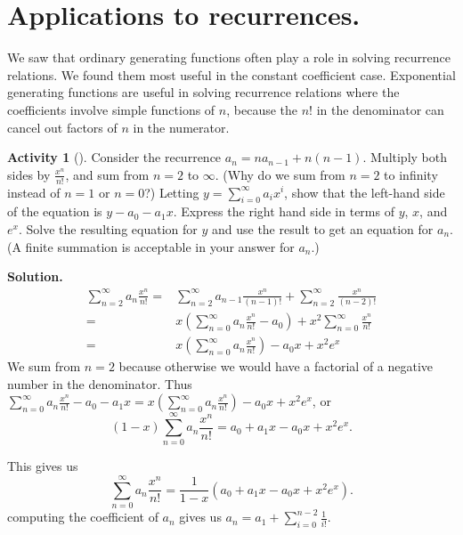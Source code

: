 \documentclass[10pt,]{book}
\theoremstyle{plain}
\theoremstyle{definition}
\newtheorem{activity}[project]{Activity}
\numberwithin{equation}{chapter}
\newcommand{\amp}{&}
\begin{document}
\section[{Applications to recurrences.}]{Applications to recurrences.}\label{section-28}
We saw that ordinary generating functions often play a role in solving recurrence relations. We found them most useful in the constant coefficient case. Exponential generating functions are useful in solving recurrence relations where the coefficients involve simple functions of \(n\), because the \(n!\) in the denominator can cancel out factors of \(n\) in the numerator.%
\begin{activity}[]\label{activity-362}
Consider the recurrence \(a_n=na_{n-1} +n(n-1)\). Multiply both sides by \(\frac{x^n}{n!}\), and sum from \(n=2\) to \(\infty\). (Why do we sum from \(n=2\) to infinity instead of \(n=1\) or \(n=0\)?) Letting \(y =
\sum_{i=0}^\infty a_ix^i\), show that the left-hand side of the equation is \(y-a_0 -a_1x\). Express the right hand side in terms of \(y\), \(x\), and \(e^x\). Solve the resulting equation for \(y\) and use the result to get an equation for \(a_n\). (A finite summation is acceptable in your answer for \(a_n\).)%
\par\medskip\noindent%
\textbf{Solution.}\quad %
\begin{align*}
\sum_{n=2}^\infty a_n\frac{x^n}{n!}
=\amp \sum_{n=2}^\infty a_{n-1}\frac{x^n}{(n-1)!} + \sum_{n=2}^\infty
\frac{x^n}{(n-2)!}\\
=\amp  x\left(\sum_{n=0}^\infty a_n\frac{x^n}{n!} - a_0\right) +
x^2\sum_{n=0}^\infty \frac{x^n}{n!}\\
=\amp  x\left(\sum_{n=0}^\infty a_n\frac{x^n}{n!}\right) - a_0x
+x^2e^x
\end{align*}
We sum from \(n=2\) because otherwise we would have a factorial of a negative number in the denominator. Thus \(\sum_{n=0}^\infty a_n\frac{x^n}{n!} -a_0-a_1x =  x\left(\sum_{n=0}^\infty a_n\frac{x^n}{n!}\right) - a_0x
+x^2e^x\), or%
\begin{equation*}
(1-x)\sum_{n=0}^\infty a_n\frac{x^n}{n!}=a_0+a_1x-a_0x +x^2e^x.
\end{equation*}
%
\par
This gives us%
\begin{equation*}
\sum_{n=0}^\infty a_n\frac{x^n}{n!}=\frac{1}{1-x}(a_0+a_1x-a_0x
+x^2e^x).
\end{equation*}
computing the coefficient of \(a_n\) gives us \(a_n = a_1 +\sum_{i=0}^{n-2}
\frac{1}{i!}\).%
\end{activity}
\end{document}
